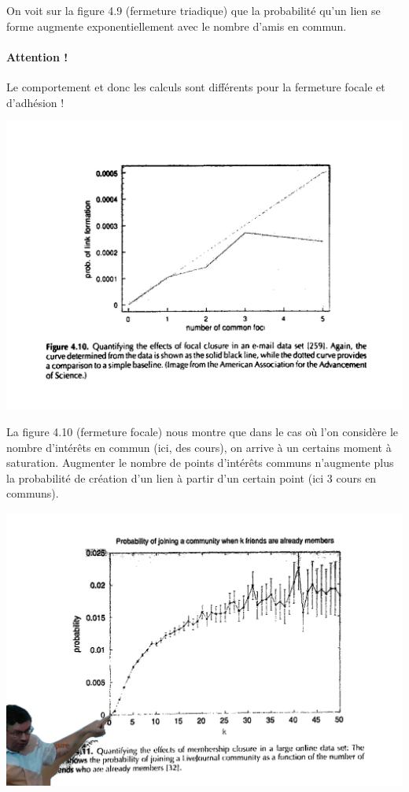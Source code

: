 On voit sur la figure 4.9 (fermeture triadique) que la probabilité qu'un lien se forme augmente exponentiellement avec le nombre d'amis en commun.

\paragraph{Attention !}
Le comportement et donc les calculs sont différents pour la fermeture focale et d'adhésion !

\includegraphics[width=\textwidth]{images/21_pointsCommuns.jpg}

La figure 4.10 (fermeture focale) nous montre que dans le cas où l'on considère le nombre d'intérêts en commun (ici, des cours), on arrive à un certains moment à saturation. Augmenter le nombre de points d'intérêts communs n'augmente plus la probabilité de création d'un lien à partir d'un certain point (ici 3 cours en communs).

\includegraphics[width=\textwidth]{images/21_community.jpg}

